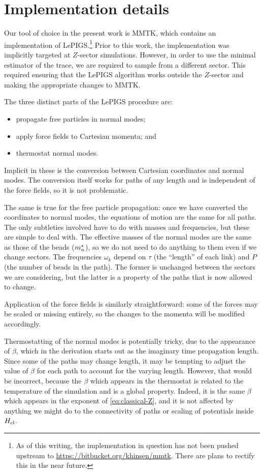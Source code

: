 \section{Implementation details}

Our tool of choice in the present work is MMTK, which contains an implementation of LePIGS.\footnote{
	As of this writing, the implementation in question has not been pushed upstream to \url{https://bitbucket.org/khinsen/mmtk}.
	There are plans to rectify this in the near future.
}
Prior to this work, the implementation was implicitly targeted at $Z$-sector simulations.
However, in order to use the minimal estimator of the trace, we are required to sample from a different sector.
This required ensuring that the LePIGS algorithm works outside the $Z$-sector and making the appropriate changes to MMTK.

The three distinct parts of the LePIGS procedure are:
\begin{itemize}
	\item propagate free particles in normal modes;
	\item apply force fields to Cartesian momenta; and
	\item thermostat normal modes.
\end{itemize}
Implicit in these is the conversion between Cartesian coordinates and normal modes.
The conversion itself works for paths of any length and is independent of the force fields, so it is not problematic.

The same is true for the free particle propagation: once we have converted the coordinates to normal modes, the equations of motion are the same for all paths.
The only subtleties involved have to do with masses and frequencies, but these are simple to deal with.
The effective masses of the normal modes are the same as those of the beads (${m}^\star_n$), so we do not need to do anything to them even if we change sectors.
The frequencies $\omega_k$ depend on $\tau$ (the ``length'' of each link) and $P$ (the number of beads in the path).
The former is unchanged between the sectors we are considering, but the latter is a property of the paths that is now allowed to change.

Application of the force fields is similarly straightforward: some of the forces may be scaled or missing entirely, so the changes to the momenta will be modified accordingly.

Thermostatting of the normal modes is potentially tricky, due to the appearance of $\beta$, which in the derivation starts out as the imaginary time propagation length.
Since some of the paths may change length, it may be tempting to adjust the value of $\beta$ for each path to account for the varying length.
However, that would be incorrect, because the $\beta$ which appears in the thermostat is related to the temperature of the simulation and is a global property.
Indeed, it is the same $\beta$ which appears in the exponent of \vref{eq:classical-Z}, and it is not affected by anything we might do to the connectivity of paths or scaling of potentials inside $H_\mathrm{cl}$.

